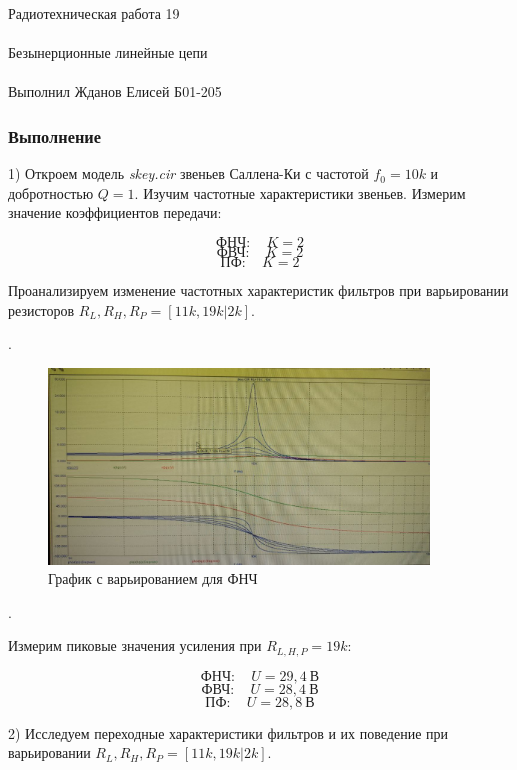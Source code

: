 \documentclass{astroedu-lab}
\begin{document}
\begin{problem}{\huge Радиотехническая работа 19\\\\Безынерционные линейные цепи\\\\Выполнил Жданов Елисей Б01-205}
\subsubsection{Выполнение}

1) Откроем модель \textit{skey.cir} звеньев Саллена-Ки с частотой $f_0 = 10k$ и добротностью $Q = 1$. Изучим частотные характеристики звеньев. Измерим значение коэффициентов передачи:

\[\textit{ФНЧ}: \quad K = 2\]
\[\textit{ФВЧ}: \quad K = 2\]
\[\textit{ПФ}: \quad K = 2\]

Проанализируем изменение частотных характеристик фильтров при варьировании резисторов $R_L, R_H, R_P = [11k, 19k|2k].$ 

.
\begin{figure}[!h]
	\centering
	\includegraphics[width=0.9\textwidth]{gr2.jpg}
	\caption{График с варьированием для ФНЧ}
	\label{fig:boiler}
\end{figure}

.

 Измерим пиковые значения усиления при $R_{L,H,P} = 19k$:

\[\textit{ФНЧ}: \quad U = 29,4 \: \text{В}\]
\[\textit{ФВЧ}: \quad U = 28,4 \: \text{В}\]
\[\textit{ПФ}: \quad U = 28,8 \: \text{В}\]

\newpage

2) Исследуем переходные характеристики фильтров и их поведение при варьировании $R_L, R_H, R_P = [11k, 19k|2k].$


\end{problem}
\end{document}
